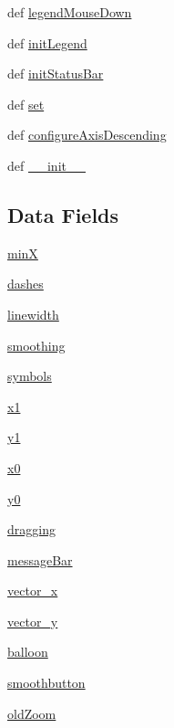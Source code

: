\begin{CompactItemize}
def \hyperlink{classdisplayGraph_1_1GraphDisplay_b943610d05ad66f01872a2e307b8edcc}{legendMouseDown}
\item 
def \hyperlink{classdisplayGraph_1_1GraphDisplay_1ebe32205ca5de1788f93136c3227c78}{initLegend}
\item 
def \hyperlink{classdisplayGraph_1_1GraphDisplay_cebf59dce13a8043711c2235d6f22a5c}{initStatusBar}
\item 
def \hyperlink{classdisplayGraph_1_1GraphDisplay_a7a5a3b2c43eb0eb3b3b3d5fb849f3f7}{set}
\item 
def \hyperlink{classdisplayGraph_1_1GraphDisplay_bea02a676e7e7bd8da55c67331af5f73}{configureAxisDescending}
\item 
def \hyperlink{classdisplayGraph_1_1GraphDisplay_ea27023f29764cb14e3cfdecd7ea6faa}{\_\-\_\-init\_\-\_\-}
\end{CompactItemize}
\subsection*{Data Fields}
\begin{CompactItemize}
\item 
\hyperlink{classdisplayGraph_1_1GraphDisplay_0dcce32e4c84f8b17abf758004e0f93b}{minX}
\item 
\hyperlink{classdisplayGraph_1_1GraphDisplay_13faa68127f12a7a1c083b709b4b21cd}{dashes}
\item 
\hyperlink{classdisplayGraph_1_1GraphDisplay_f1e297cc7e2d00a0bef5585cc4fe2185}{linewidth}
\item 
\hyperlink{classdisplayGraph_1_1GraphDisplay_b756efcf260f87abf67627ae8a388de8}{smoothing}
\item 
\hyperlink{classdisplayGraph_1_1GraphDisplay_f43fecb0696c2cb7d4ced69cd06a8b9a}{symbols}
\item 
\hyperlink{classdisplayGraph_1_1GraphDisplay_328744492de5b966e761fc374967b4d2}{x1}
\item 
\hyperlink{classdisplayGraph_1_1GraphDisplay_8f8b6510fc540ae2b523046fa9b9887e}{y1}
\item 
\hyperlink{classdisplayGraph_1_1GraphDisplay_4915cf65ca0ec3bcf599b0dbeeaf41bf}{x0}
\item 
\hyperlink{classdisplayGraph_1_1GraphDisplay_99b14b23dc0bdf83123a0ca20696adc9}{y0}
\item 
\hyperlink{classdisplayGraph_1_1GraphDisplay_fe0774448a4c8ec69d9afc4794ba0bb9}{dragging}
\item 
\hyperlink{classdisplayGraph_1_1GraphDisplay_74dc89789789b190048f9a6c3ae4396f}{messageBar}
\item 
\hyperlink{classdisplayGraph_1_1GraphDisplay_6b36f9908bcd795f80d1b4f14f529e66}{vector\_\-x}
\item 
\hyperlink{classdisplayGraph_1_1GraphDisplay_df1034109213462a755299ada96f301f}{vector\_\-y}
\item 
\hyperlink{classdisplayGraph_1_1GraphDisplay_91314fe213efdd5064e3938c8b9cd790}{balloon}
\item 
\hyperlink{classdisplayGraph_1_1GraphDisplay_2283a1a5dfdb76c93366ae656861c0b1}{smoothbutton}
\item 
\hyperlink{classdisplayGraph_1_1GraphDisplay_a66b0b71b5ebcbd0685e0fb1b4b363e7}{oldZoom}
\end{CompactItemize}
